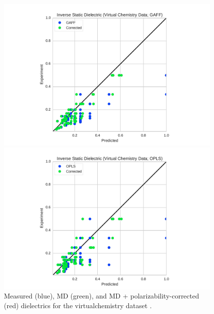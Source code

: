 \documentclass[journal=jacsat,manuscript=article]{achemso}
\begin{document}
\begin{figure}

\includegraphics[width=\columnwidth]{./figures/dielectric_virtual_chemistry_gaff.pdf}

\includegraphics[width=\columnwidth]{./figures/dielectric_virtual_chemistry_opls.pdf}


\caption{Measured (blue), MD (green), and MD + polarizability-corrected (red) dielectrics for the virtualchemistry dataset \cite{caleman2011force, van2012gromacs}.
}
\label{figure:VirtualChemistry}
\end{figure}


\end{document}
